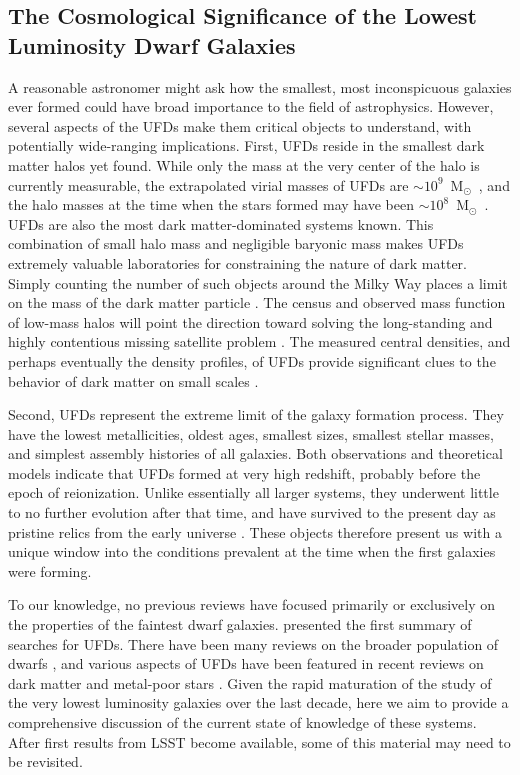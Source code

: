 \documentclass[a4paper]{ar-1col}
\newcommand{\msun}        {M$_{\odot}$}
\begin{document}
\subsection{The Cosmological Significance of the Lowest Luminosity
  Dwarf Galaxies}

A reasonable astronomer might ask how the smallest, most inconspicuous
galaxies ever formed could have broad importance to the field of
astrophysics.  However, several aspects of the UFDs make them critical
objects to understand, with potentially wide-ranging implications.
First, UFDs reside in the smallest dark matter halos yet found.  While
only the mass at the very center of the halo is currently measurable,
the extrapolated virial masses of UFDs are
$\sim10^{9}$~\msun\ \citep[e.g.,][]{strigari08}, and the halo masses
at the time when the stars formed may have been
$\sim10^{8}$~\msun\ \citep[e.g.,][]{br09,safarzadeh18}.  UFDs are also
the most dark matter-dominated systems known.  This combination of
small halo mass and negligible baryonic mass makes UFDs extremely
valuable laboratories for constraining the nature of dark matter.
Simply counting the number of such objects around the Milky Way places
a limit on the mass of the dark matter particle
\citep[e.g.,][]{jethwa18}.  The census and observed mass function of
low-mass halos will point the direction toward solving the
long-standing and highly contentious missing satellite problem
\citep[e.g.,][]{klypin99,moore99,sg07,brooks13,kim18}.  The measured
central densities, and perhaps eventually the density profiles, of
UFDs provide significant clues to the behavior of dark matter on small
scales \citep[e.g.,][]{cs16,bozek18,errani18}.

Second, UFDs represent the extreme limit of the galaxy formation
process.  They have the lowest metallicities, oldest ages, smallest
sizes, smallest stellar masses, and simplest assembly histories of all
galaxies.  Both observations and theoretical models indicate that UFDs
formed at very high redshift, probably before the epoch of
reionization.  Unlike essentially all larger systems, they underwent
little to no further evolution after that time, and have survived to
the present day as pristine relics from the early universe
\citep[e.g.,][]{br09,br11a,wheeler15}.  These objects therefore
present us with a unique window into the conditions prevalent at the
time when the first galaxies were forming.

To our knowledge, no previous reviews have focused primarily or
exclusively on the properties of the faintest dwarf galaxies.
\citet{willman10} presented the first summary of searches for UFDs.
There have been many reviews on the broader population of dwarfs
\citep[e.g.,][the latter two of which also discuss
  UFDs]{mateo98,tolstoy09,mcconnachie12}, and various aspects of UFDs
have been featured in recent reviews on dark matter
\citep[e.g.,][]{bbk17,strigari18} and metal-poor stars
\citep[e.g.,][]{fn15}.  Given the rapid maturation of the study of the
very lowest luminosity galaxies over the last decade, here we aim to
provide a comprehensive discussion of the current state of knowledge
of these systems.  After first results from LSST become available,
some of this material may need to be revisited.
\end{document}
